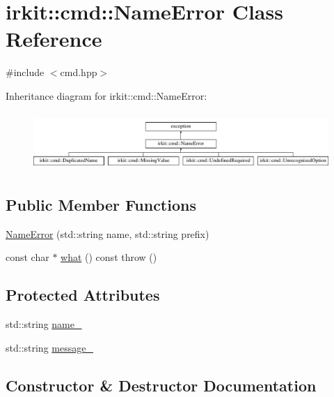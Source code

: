 \hypertarget{classirkit_1_1cmd_1_1NameError}{}\section{irkit\+:\+:cmd\+:\+:Name\+Error Class Reference}
\label{classirkit_1_1cmd_1_1NameError}


{\ttfamily \#include $<$cmd.\+hpp$>$}

Inheritance diagram for irkit\+:\+:cmd\+:\+:Name\+Error\+:\begin{figure}[H]
\begin{center}
\leavevmode
\includegraphics[height=2.210526cm]{classirkit_1_1cmd_1_1NameError}
\end{center}
\end{figure}
\subsection*{Public Member Functions}
\begin{DoxyCompactItemize}
\item 
\mbox{\hyperlink{classirkit_1_1cmd_1_1NameError_a177e04676180c371c053eeca3945ed1a}{Name\+Error}} (std\+::string name, std\+::string prefix)
\item 
const char $\ast$ \mbox{\hyperlink{classirkit_1_1cmd_1_1NameError_a623fcf339a7888848347f8afbeb35742}{what}} () const  throw ()
\end{DoxyCompactItemize}
\subsection*{Protected Attributes}
\begin{DoxyCompactItemize}
\item 
std\+::string \mbox{\hyperlink{classirkit_1_1cmd_1_1NameError_ace25d86fda0c8803f7f59198fa550aa2}{name\+\_\+}}
\item 
std\+::string \mbox{\hyperlink{classirkit_1_1cmd_1_1NameError_a619a611ece431af4c1100e97ec3daff4}{message\+\_\+}}
\end{DoxyCompactItemize}


\subsection{Constructor \& Destructor Documentation}
\mbox{\label{classirkit_1_1cmd_1_1NameError_a177e04676180c371c053eeca3945ed1a}} 
